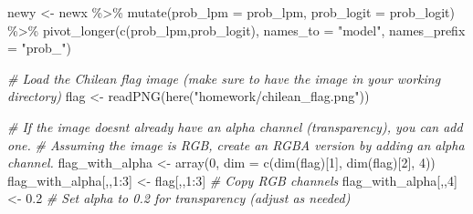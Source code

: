 \documentclass[
  12pt,
  a4paper,
]{article}
\newenvironment{Shaded}{\begin{snugshade}}{\end{snugshade}}
\newcommand{\AttributeTok}[1]{\textcolor[rgb]{0.77,0.63,0.00}{#1}}
\newcommand{\CommentTok}[1]{\textcolor[rgb]{0.56,0.35,0.01}{\textit{#1}}}
\newcommand{\DecValTok}[1]{\textcolor[rgb]{0.00,0.00,0.81}{#1}}
\newcommand{\FloatTok}[1]{\textcolor[rgb]{0.00,0.00,0.81}{#1}}
\newcommand{\FunctionTok}[1]{\textcolor[rgb]{0.00,0.00,0.00}{#1}}
\newcommand{\NormalTok}[1]{#1}
\newcommand{\OtherTok}[1]{\textcolor[rgb]{0.56,0.35,0.01}{#1}}
\newcommand{\SpecialCharTok}[1]{\textcolor[rgb]{0.00,0.00,0.00}{#1}}
\newcommand{\StringTok}[1]{\textcolor[rgb]{0.31,0.60,0.02}{#1}}
\begin{document}
\begin{Shaded}
\begin{Highlighting}[]
\NormalTok{newy }\OtherTok{\textless{}{-}}\NormalTok{ newx }\SpecialCharTok{\%\textgreater{}\%} \FunctionTok{mutate}\NormalTok{(}\AttributeTok{prob\_lpm =}\NormalTok{ prob\_lpm, }\AttributeTok{prob\_logit =}\NormalTok{ prob\_logit) }\SpecialCharTok{\%\textgreater{}\%}
          \FunctionTok{pivot\_longer}\NormalTok{(}\FunctionTok{c}\NormalTok{(prob\_lpm,prob\_logit), }\AttributeTok{names\_to =} \StringTok{"model"}\NormalTok{, }\AttributeTok{names\_prefix =} \StringTok{"prob\_"}\NormalTok{)}


\CommentTok{\# Load the Chilean flag image (make sure to have the image in your working directory)}
\NormalTok{flag }\OtherTok{\textless{}{-}} \FunctionTok{readPNG}\NormalTok{(}\FunctionTok{here}\NormalTok{(}\StringTok{"homework/chilean\_flag.png"}\NormalTok{))}

\CommentTok{\# If the image doesn\textquotesingle{}t already have an alpha channel (transparency), you can add one.}
\CommentTok{\# Assuming the image is RGB, create an RGBA version by adding an alpha channel.}
\NormalTok{flag\_with\_alpha }\OtherTok{\textless{}{-}} \FunctionTok{array}\NormalTok{(}\DecValTok{0}\NormalTok{, }\AttributeTok{dim =} \FunctionTok{c}\NormalTok{(}\FunctionTok{dim}\NormalTok{(flag)[}\DecValTok{1}\NormalTok{], }\FunctionTok{dim}\NormalTok{(flag)[}\DecValTok{2}\NormalTok{], }\DecValTok{4}\NormalTok{))}
\NormalTok{flag\_with\_alpha[,,}\DecValTok{1}\SpecialCharTok{:}\DecValTok{3}\NormalTok{] }\OtherTok{\textless{}{-}}\NormalTok{ flag[,,}\DecValTok{1}\SpecialCharTok{:}\DecValTok{3}\NormalTok{]  }\CommentTok{\# Copy RGB channels}
\NormalTok{flag\_with\_alpha[,,}\DecValTok{4}\NormalTok{] }\OtherTok{\textless{}{-}} \FloatTok{0.2}  \CommentTok{\# Set alpha to 0.2 for transparency (adjust as needed)}


\end{Highlighting}
\end{Shaded}
\end{document}
